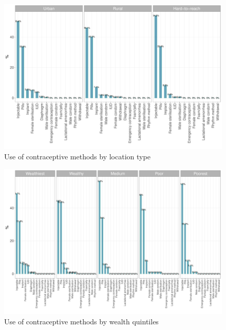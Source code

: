 \documentclass[12pt,a4paper]{article}
\begin{document}
\begin{figure}[H]

{\centering \includegraphics{kayinReport_files/figure-latex/fplan1plot-1} 

}

\caption{Use of contraceptive methods by location type}\label{fig:fplan1plot}
\end{figure}

\begin{figure}[H]

{\centering \includegraphics{kayinReport_files/figure-latex/fplan2plot-1} 

}

\caption{Use of contraceptive methods by wealth quintiles}\label{fig:fplan2plot}
\end{figure}
\end{document}
